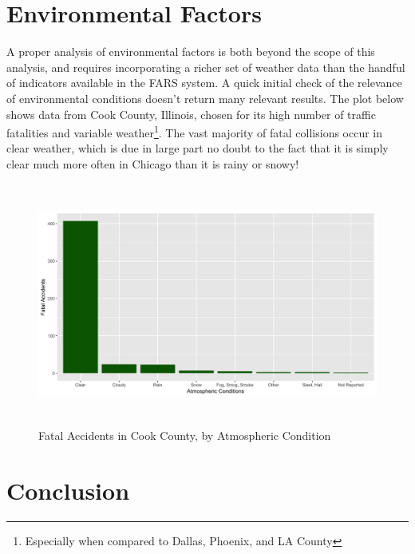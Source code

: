 \documentclass[11pt, oneside,titlepage]{article}   	%
\begin{document}
\section*{Environmental Factors}
A proper analysis of environmental factors is both beyond the scope of this analysis, and requires incorporating a richer set of weather data than the handful of indicators available in the FARS system. A quick initial check of the relevance of environmental conditions doesn't return many relevant results. The plot below shows data from Cook County, Illinois, chosen for its high number of traffic fatalities and variable weather\footnote{Especially when compared to Dallas, Phoenix, and LA County}. The vast majority of fatal collisions occur in clear weather, which is due in large part no doubt to the fact that it is simply clear much more often in Chicago than it is rainy or snowy! 

\begin{figure}[H]
\centering
  \includegraphics[width=15cm,height=8cm,keepaspectratio]{Environmental.png}
\caption{Fatal Accidents in Cook County, by Atmospheric Condition}
\end{figure}


\section*{Conclusion}
\end{document}
